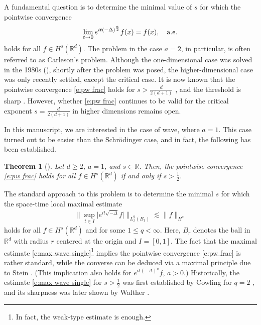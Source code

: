 \documentclass[a4paper]{amsart}
\numberwithin{figure}{section}
\numberwithin{equation}{section}%
\theoremstyle{plain}%
\newtheorem{theorem}{Theorem}[section]
\theoremstyle{definition}
\theoremstyle{remark}%
\def\ae{{\rm a.e.}}
\newcommand{\R}{{\mathbb R}}
\begin{document}
A fundamental question is to determine the minimal value of $s$ for which the pointwise convergence 
\begin{equation}\label{e:pw frac}
    \lim_{t\to0} e^{it(-\Delta)^\frac a2}f(x)
    =
    f(x),\quad \ae
\end{equation}
holds for all $f\in H^s(\R^d)$. The problem in the case $a=2$, in particular, is often referred to as Carleson's problem. Although the one-dimensional case was solved in the 1980s (\cite{Carleson,DK82}),  shortly after the problem was posed, the higher-dimensional case was only recently settled, except the critical case. It is now known that the pointwise convergence \eqref{e:pw frac} holds for $s>\frac{d}{2(d+1)}$ \cite{DGL17, DZ19}, and the threshold is sharp \cite{Bourgain16}. However, whether \eqref{e:pw frac} continues to be  valid for the critical exponent $s=\frac{d}{2(d+1)}$ in higher dimensions remains open. 

In this manuscript, we are interested in the case of wave, where $a=1$. This case turned out to be easier than the Schr\"odinger case, and in fact, the following has been established. 

\begin{theorem}[\cite{Cowling, Walther}]
    Let $d\geq 2$, $a=1$, and $s\in \mathbb R$. Then, the pointwise convergence \eqref{e:pw frac} holds for all $f\in H^s(\R^d)$ if and only if $s>\frac12$.
\end{theorem}


The standard approach to this problem is to determine the minimal $s$ for which the space-time local maximal estimate 
\begin{align}\label{e:max wave single}
\big\| \sup_{t\in I}\big|e^{it\sqrt{-\Delta}}f\big| \big\|_{L_x^q(B_1)}\lesssim \|f\|_{H^s}
\end{align}
holds for all $f\in H^s(\R^d)$ and  for some $1\leq q<\infty$. Here, $B_r$ denotes the ball in $\R^d$ with radius $r$  centered at the origin and $I=[0,1]$.
The fact that the maximal estimate  \eqref{e:max wave single}\footnote{In fact, the weak-type estimate is enough.} implies the pointwise convergence \eqref{e:pw frac} is rather standard, while the converse can be deduced via a maximal principle due to Stein \cite{Stein61}. (This implication  also holds for $e^{it(-\Delta)^a}f$, $a>0$.) Historically, the estimate \eqref{e:max wave single} for $s>\frac12$ was first established by Cowling for $q=2$ \cite{Cowling}, and its 
sharpness was later shown  by Walther \cite{Walther}.
\end{document}

